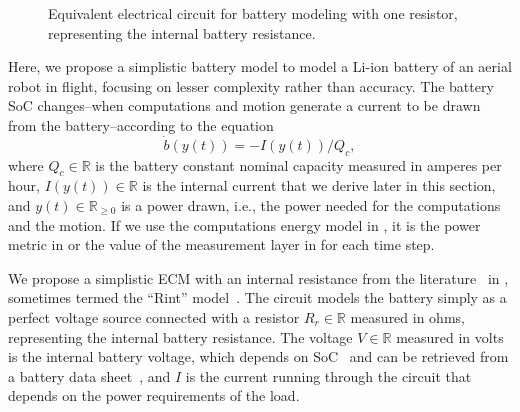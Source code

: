 \begin{figure}[h!]
  \centering
  \selectfont
  
  \caption[Equivalent electrical circuit for battery modeling with an internal resistance]{Equivalent electrical circuit for battery modeling with one resistor, representing the internal battery resistance.}
  \label{fig:rint}
\end{figure}
Here, we propose a simplistic battery model to model a Li-ion battery of an aerial robot in flight, focusing on lesser complexity rather than accuracy. The battery SoC changes--when computations and motion generate a current to be drawn from the battery--according to the equation~\citep{zhang2018online,hasan2018exogenous}
\begin{equation}\label{eq:socevol}
  \dot{b}(y(t))=-I(y(t))/Q_c,
\end{equation}
where $Q_c\in\mathbb{R}$ is the battery constant nominal capacity measured in amperes per hour, $I(y(t))\in\mathbb{R}$ is the internal current that we derive later in this section, and $y(t)\in\mathbb{R}_{\geq 0}$ is a power drawn, i.e., the power needed for the computations and the motion. 
If we use the computations energy model in , it is the power metric in  or the value of the measurement layer in  for each time step.

We propose a simplistic ECM with an internal resistance from the literature~\citep{mousavi2014various,hinz2019comparison,he2011evaluation} in , sometimes termed the ``Rint'' model~\citep{hinz2019comparison,he2011evaluation}. The circuit models the battery simply as a perfect voltage source connected with a resistor $R_r\in\mathbb{R}$ measured in ohms, representing the internal battery resistance. The voltage $V\in\mathbb{R}$ measured in volts is the internal battery voltage, which depends on SoC~\citep{hasan2018exogenous} and can be retrieved from a battery data sheet~\citep{hinz2019comparison}, and $I$ is the current running through the circuit that depends on the power requirements of the load.

